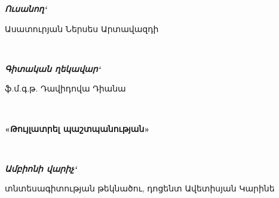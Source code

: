 \documentclass[12pt,a4paper,oneside]{report}
\begin{document}
\noindent
\begin{minipage}[t]{0.28\textwidth}
\begin{armenian}\fontsize{13}{16}\selectfont\textit{\textbf{Ուսանող`}}\end{armenian}
\end{minipage}%
\begin{minipage}[t]{0.6\textwidth}
\vspace*{0.7cm}\par
\centering\begin{armenian}\small Ասատուրյան Ներսես Արտավազդի\end{armenian}
\end{minipage}\\[1.5cm]

\noindent
\begin{minipage}[t]{0.28\textwidth}
\begin{armenian}\fontsize{13}{16}\selectfont\textit{\textbf{Գիտական ղեկավար`}}\end{armenian}
\end{minipage}%
\begin{minipage}[t]{0.6\textwidth}
\vspace*{0.7cm}\par
\centering\begin{armenian}\small ֆ.մ.գ.թ. Դավիդովա Դիանա\end{armenian}
\end{minipage}\\[1.5cm]

\noindent\begin{armenian}\fontsize{13}{16}\selectfont\textbf{«Թույլատրել պաշտպանության»}\end{armenian}\\[1cm]

\noindent
\begin{minipage}[t]{0.28\textwidth}
\begin{armenian}\fontsize{13}{16}\selectfont\textit{\textbf{Ամբիոնի վարիչ`}}\end{armenian}
\end{minipage}%
\begin{minipage}[t]{0.6\textwidth}
\vspace*{0.7cm}\par
\centering\begin{armenian}\small տնտեսագիտության թեկնածու, դոցենտ Ավետիսյան Կարինե\end{armenian}
\end{minipage}\\[2cm]
\end{document}
